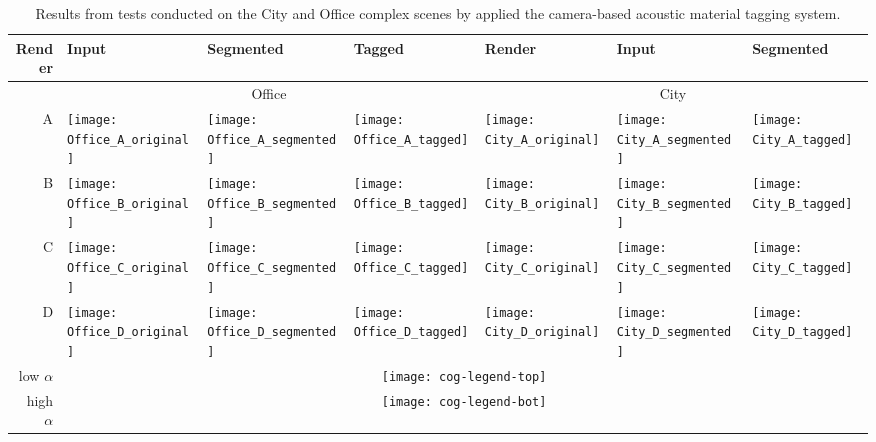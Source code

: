 \begin{landscape}
\begin{table}[]
\def\cogimsw{0.17\textwidth}
\centering
\caption{Results from tests conducted on the City and Office complex scenes by applied the camera-based acoustic material tagging system.}
\begin{tabular}{rllllll}
\toprule
Render & Input & Segmented & Tagged & Render & Input & Segmented \\ \midrule
\multicolumn{1}{r}{}  & \multicolumn{3}{c}{Office} & \multicolumn{3}{c}{City} \\
\multicolumn{1}{r}{A} & \texttt{[image: Office\_A\_original]} & \texttt{[image: Office\_A\_segmented]} & \texttt{[image: Office\_A\_tagged]} & \texttt{[image: City\_A\_original]} & \texttt{[image: City\_A\_segmented]} & \texttt{[image: City\_A\_tagged]} \\
\multicolumn{1}{r}{B} & \texttt{[image: Office\_B\_original]} & \texttt{[image: Office\_B\_segmented]} & \texttt{[image: Office\_B\_tagged]} & \texttt{[image: City\_B\_original]} & \texttt{[image: City\_B\_segmented]} & \texttt{[image: City\_B\_tagged]} \\
\multicolumn{1}{r}{C} & \texttt{[image: Office\_C\_original]} & \texttt{[image: Office\_C\_segmented]} & \texttt{[image: Office\_C\_tagged]} & \texttt{[image: City\_C\_original]} & \texttt{[image: City\_C\_segmented]} & \texttt{[image: City\_C\_tagged]} \\
\multicolumn{1}{r}{D} & \texttt{[image: Office\_D\_original]} & \texttt{[image: Office\_D\_segmented]} & \texttt{[image: Office\_D\_tagged]} & \texttt{[image: City\_D\_original]} & \texttt{[image: City\_D\_segmented]} & \texttt{[image: City\_D\_tagged]} \\
\multicolumn{1}{r}{low $\alpha$} & \multicolumn{6}{c}{\texttt{[image: cog-legend-top]}} \\
\multicolumn{1}{r}{high $\alpha$} & \multicolumn{6}{c}{\texttt{[image: cog-legend-bot]}} 
\end{tabular}
\label{tab:cog-preliminary-results}
\end{table}
\end{landscape}